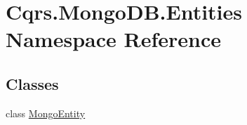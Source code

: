 \hypertarget{namespaceCqrs_1_1MongoDB_1_1Entities}{}\section{Cqrs.\+Mongo\+D\+B.\+Entities Namespace Reference}
\label{namespaceCqrs_1_1MongoDB_1_1Entities}
\subsection*{Classes}
\begin{DoxyCompactItemize}
\item 
class \hyperlink{classCqrs_1_1MongoDB_1_1Entities_1_1MongoEntity}{Mongo\+Entity}
\end{DoxyCompactItemize}
